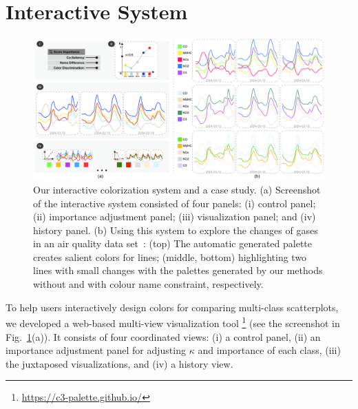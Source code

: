 \section{Interactive System}


\begin{figure}[ht]
\centering
\includegraphics[width=1.0\columnwidth]{figures/interface.pdf}
\caption{Our interactive colorization system and a case study. (a) Screenshot of the interactive system consisted of four panels: (i) control panel; (ii) importance adjustment panel; (iii) visualization panel; and (iv) history panel. (b) Using this system to explore the changes of gases in an air quality data set~\cite{DEVITO2008750}: (top) The automatic generated palette creates salient colors for  lines; (middle, bottom) highlighting two lines with small changes with the palettes generated by our methods without and with colour name constraint, respectively.}
\vspace*{-3mm}
\label{fig:ui-case}
\end{figure}

\label{sec:interaction}
To help users interactively design colors for comparing multi-class scatterplots, we developed a web-based multi-view visualization tool \footnote{\small \url{https://c3-palette.github.io/}}
(see the screenshot in Fig.~\ref{fig:ui-case}(a)).
It consists of four coordinated views: (i) a control panel, (ii) an importance adjustment panel for adjusting $\kappa$ and  importance of each class, (iii) the juxtaposed visualizations, and (iv) a history view. 

